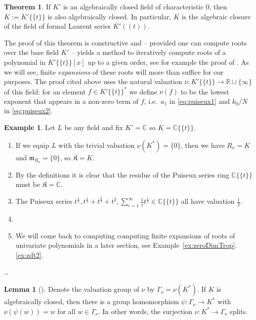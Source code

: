 \documentclass[
  paper=a4,
  titlepage,
  bibliography=totoc,
  listof=totoc,
  pagesize=pdftex
]{scrartcl}
\numberwithin{figure}{section}
\numberwithin{equation}{section}
\numberwithin{table}{section}
\newcommand*\setR{\mathds{R}}
\newcommand*\setC{\mathds{C}}
\newcommand*\puiseux[2]{#1\{\!\{#2\}\!\}}
\newcommand*\CCt{\puiseux{\setC}{t}}
\theoremstyle{definition}
\newtheorem{theorem}[definition]{Theorem}
\newtheorem{example}[definition]{Example}
\newtheorem{lemma}[definition]{Lemma}
\numberwithin{definition}{section}
\begin{document}
\begin{theorem}
  \label{thm:puisuexalgclosed}
  If $K'$ is an algebraically closed field of characteristic 0, then $K :=
  \puiseux{K'}{t}$ is also algebraically closed. In particular, $K$ is the algebraic
  closure of the field of formal Laurent series $K'((t))$.
\end{theorem}

The proof of this theorem is constructive and -- provided one can compute roots over the
base field $K'$ -- yields a method to iteratively compute roots of a polynomial in
$\puiseux{K'}{t}[x]$ up to a given order, see for example the proof of
\cite[Theorem~2.1.5]{sturmMacTrop}. As we will see, finite \emph{expansions} of these
roots will more than suffice for our purposes. The proof cited above uses the natural
valuation $\nu : \puiseux{K'}{t} \to \setR \cup \{\infty\}$ of this field: for an element
$f \in \puiseux{K'}{t}^*$ we define $\nu(f)$ to be the lowest exponent that appears in a
non-zero term of $f$, i.e.\ $a_1$ in \eqref{eq:puiseux1} and $k_0/N$ in
\eqref{eq:puiseux2}.

\begin{example} \label{ex:valuations}
  Let $L$ be any field and fix $K' = \setC$ so $K = \CCt$.
  \begin{enumerate}
    \item If we equip $L$ with the trivial valuation $\nu(K^*) = \{0\}$, then we have
      $R_\nu = K$ and $\mathfrak m_{R_\nu} = \{0\}$, so $\mathfrak K = K$.
    \item By the definitions it is clear that the residue of the Puiseux series ring
      $\CCt$ must be $\mathfrak K = \setC$. %
    \item The Puiseux series $t^{\frac12}, t^{\frac12} + t^{\frac23} + t^2,
      \sum_{i=1}^\infty \frac1i t^{\frac i2} \in \CCt$ all have valuation $\frac12$.
    \item %
    \item We will come back to computing computing finite expansions of roots of
      univariate polynomials in a later section, see
      Example~\ref{ex:zeroDimTrop}.\ref{ex:zdt2}.
  \end{enumerate}
\end{example}

\dots %

\begin{lemma}[{\cite[Lemma~2.1.15]{sturmMacTrop}}]
  \label{lem:valSplit}
  Denote the valuation group of $\nu$ by $\Gamma_\nu = \nu(K^*)$. If $K$ is algebraically
  closed, then there is a group homomorphism $\psi : \Gamma_\nu \to K^*$ with
  $\nu(\psi(w)) = w$ for all $w \in \Gamma_\nu$. In other words, the surjection $\nu : K^*
  \to \Gamma_\nu$ splits.
\end{lemma}
\end{document}
